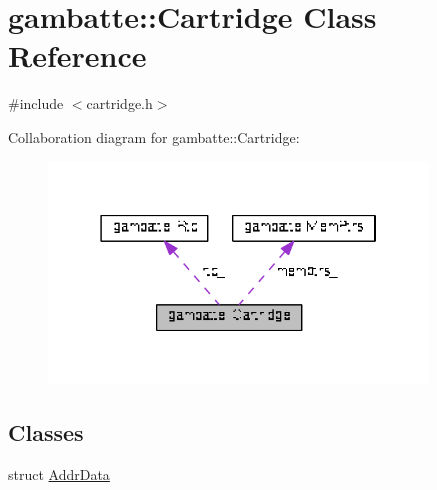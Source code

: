 \hypertarget{classgambatte_1_1Cartridge}{}\section{gambatte\+:\+:Cartridge Class Reference}
\label{classgambatte_1_1Cartridge}


{\ttfamily \#include $<$cartridge.\+h$>$}



Collaboration diagram for gambatte\+:\+:Cartridge\+:
\nopagebreak
\begin{figure}[H]
\begin{center}
\leavevmode
\includegraphics[width=286pt]{classgambatte_1_1Cartridge__coll__graph}
\end{center}
\end{figure}
\subsection*{Classes}
\begin{DoxyCompactItemize}
\item 
struct \hyperlink{structgambatte_1_1Cartridge_1_1AddrData}{Addr\+Data}
\end{DoxyCompactItemize}
